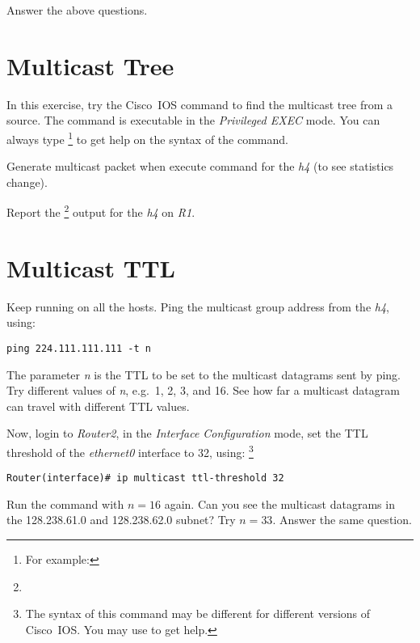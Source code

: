 \documentclass{../UTNetLab}
\begin{document}
\begin{report}
    \item Answer the above questions.
\end{report}

\section{Multicast Tree}
In this exercise, try the  Cisco~IOS command to find the multicast tree from a source.
The  command is executable in the \textit{Privileged EXEC} mode.
You can always type \footnote{For example: } to get help on the syntax of the command.

Generate multicast packet when execute command for the \textit{h4} (to see statistics change).

\begin{report}
    \item Report the \footnote{} output for the \textit{h4} on \textit{R1}.
\end{report}

\section{Multicast TTL}
Keep  running on all the hosts.
Ping the multicast group address from the \textit{h4}, using:
\begin{lstlisting}[emph={n}]
ping 224.111.111.111 -t n
    \end{lstlisting}

The parameter \textit{n} is the TTL to be set to the multicast datagrams sent by ping.
Try different values of \textit{n}, e.g.\ 1, 2, 3, and 16.
See how far a multicast datagram can travel with different TTL values.

Now, login to \textit{Router2}, in the \textit{Interface Configuration} mode, set the TTL threshold of the \textit{ethernet0} interface to 32, using:
\footnote{The syntax of this command may be different for different versions of Cisco~IOS.
    You may use  to get help.}
\begin{lstlisting}[language={cisco}]    
Router(interface)# ip multicast ttl-threshold 32
    \end{lstlisting}

Run the  command with $n = 16$ again.
Can you see the multicast datagrams in the 128.238.61.0 and 128.238.62.0 subnet?
Try $n = 33$.
Answer the same question.
\end{document}
